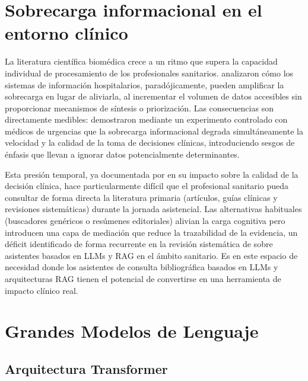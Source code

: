 \documentclass[11pt,a4paper,spanish]{book}
\numberwithin{equation}{chapter}
\numberwithin{figure}{chapter}
\begin{document}
\section{Sobrecarga informacional en el entorno clínico}

La literatura científica biomédica crece a un ritmo que supera la capacidad individual de procesamiento de los profesionales sanitarios.  analizaron cómo los sistemas de información hospitalarios, paradójicamente, pueden amplificar la sobrecarga en lugar de aliviarla, al incrementar el volumen de datos accesibles sin proporcionar mecanismos de síntesis o priorización. Las consecuencias son directamente medibles:  demostraron mediante un experimento controlado con médicos de urgencias que la sobrecarga informacional degrada simultáneamente la velocidad y la calidad de la toma de decisiones clínicas, introduciendo sesgos de énfasis que llevan a ignorar datos potencialmente determinantes.

Esta presión temporal, ya documentada por  en su impacto sobre la calidad de la decisión clínica, hace particularmente difícil que el profesional sanitario pueda consultar de forma directa la literatura primaria (artículos, guías clínicas y revisiones sistemáticas) durante la jornada asistencial. Las alternativas habituales (buscadores genéricos o resúmenes editoriales) alivian la carga cognitiva pero introducen una capa de mediación que reduce la trazabilidad de la evidencia, un déficit identificado de forma recurrente en la revisión sistemática de  sobre asistentes basados en LLMs y RAG en el ámbito sanitario. Es en este espacio de necesidad donde los asistentes de consulta bibliográfica basados en LLMs y arquitecturas RAG tienen el potencial de convertirse en una herramienta de impacto clínico real.

\section{Grandes Modelos de Lenguaje}

\subsection{Arquitectura Transformer}
\end{document}
